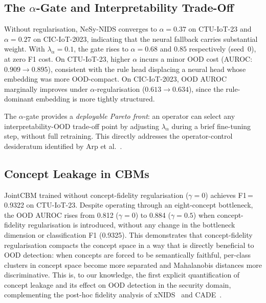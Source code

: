 \documentclass[journal]{IEEEtran}
\begin{document}
\subsection{The \texorpdfstring{$\alpha$}{alpha}-Gate and Interpretability Trade-Off}

Without regularisation, NeSy-NIDS converges to $\alpha{=}0.37$ on
CTU-IoT-23 and $\alpha{=}0.27$ on CIC-IoT-2023, indicating that the
neural fallback carries substantial weight. With $\lambda_\alpha{=}0.1$,
the gate rises to $\alpha{=}0.68$ and $0.85$ respectively (seed~0), at
zero F1 cost. On CTU-IoT-23, higher $\alpha$ incurs a minor OOD cost
(AUROC: $0.909\to0.895$), consistent with the rule head displacing a
neural head whose embedding was more OOD-compact. On CIC-IoT-2023, OOD
AUROC marginally improves under $\alpha$-regularisation
($0.613\to0.634$), since the rule-dominant embedding is more tightly
structured.

The $\alpha$-gate provides a \emph{deployable Pareto front}: an
operator can select any interpretability-OOD trade-off point by
adjusting $\lambda_\alpha$ during a brief fine-tuning step, without
full retraining. This directly addresses the operator-control
desideratum identified by Arp et al.~\cite{arp2022dos}.

\subsection{Concept Leakage in CBMs}
\label{sec:leakage}

JointCBM trained without concept-fidelity regularisation ($\gamma{=}0$)
achieves F1\,=\,0.9322 on CTU-IoT-23. Despite operating through an
eight-concept bottleneck, the OOD AUROC rises from 0.812 ($\gamma{=}0$)
to 0.884 ($\gamma{=}0.5$) when concept-fidelity regularisation is
introduced, without any change in the bottleneck dimension or
classification F1 (0.9325). This demonstrates that concept-fidelity
regularisation compacts the concept space in a way that is directly
beneficial to OOD detection: when concepts are forced to be semantically
faithful, per-class clusters in concept space become more separated and
Mahalanobis distances more discriminative. This is, to our knowledge,
the first explicit quantification of concept leakage and its effect on
OOD detection in the security domain, complementing the post-hoc
fidelity analysis of xNIDS~\cite{wei2023xnids} and
CADE~\cite{yang2021cade}.
\end{document}
